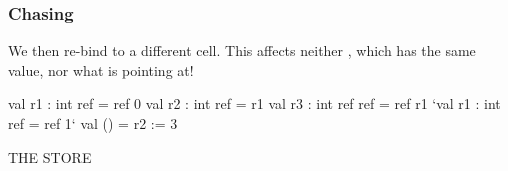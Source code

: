 \documentclass[aspectratio=169, handout]{beamer}
\newcommand{\topthing}[2]{
      \begin{minipage}[t][#1][t]{\textwidth}
        \vspace{\fill}
        #2
        \vspace{\fill}
      \end{minipage}
    }
\begin{document}
\begin{frame}[fragile]
  \frametitle{ Chasing}

  \topthing{0.2in}{
    We then re-bind  to a different \code{ref} cell. This affects neither
    \code{r2}, which has the same value, nor what \code{r3} is pointing at!
  }

  \vspace{10pt}

  \begin{center}
    \begin{minipage}[t][2.1in][t]{0.6\textwidth}
      \vspace{\fill}
      \begin{codeblock}
        val r1 : int ref     = ref 0
        val r2 : int ref     = r1
        val r3 : int ref ref = ref r1
        `val r1 : int ref     = ref 1`
        val ()               = r2 := 3
      \end{codeblock}
      \vspace{\fill}
    \end{minipage}
    \hfill\vline\hfill
    \begin{minipage}[t][2.1in][t]{0.3\textwidth}
      \centering
      {\hspace{-20pt}\color{gray} \large THE STORE}

      \vspace{\fill}
      \vspace{\fill}
    \end{minipage}
  \end{center}
\end{frame}
\end{document}
